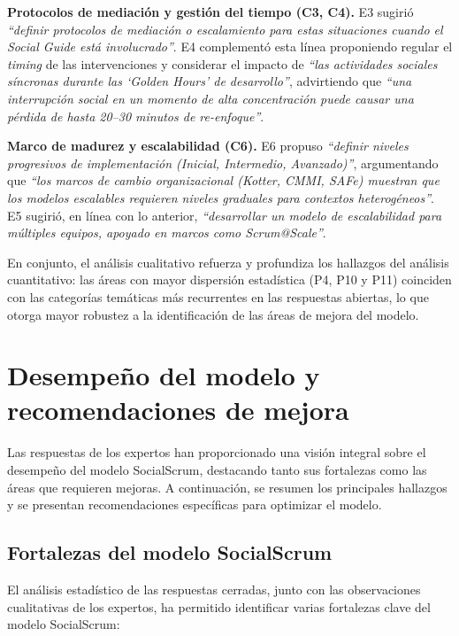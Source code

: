 \textbf{Protocolos de mediación y gestión del tiempo (C3, C4).} E3 sugirió \textit{``definir protocolos de mediación o escalamiento para estas situaciones cuando el Social Guide está involucrado''}. E4 complementó esta línea proponiendo regular el \textit{timing} de las intervenciones y considerar el impacto de \textit{``las actividades sociales síncronas durante las `Golden Hours' de desarrollo''}, advirtiendo que \textit{``una interrupción social en un momento de alta concentración puede causar una pérdida de hasta 20--30 minutos de re-enfoque''}.

\textbf{Marco de madurez y escalabilidad (C6).} E6 propuso \textit{``definir niveles progresivos de implementación (Inicial, Intermedio, Avanzado)''}, argumentando que \textit{``los marcos de cambio organizacional (Kotter, CMMI, SAFe) muestran que los modelos escalables requieren niveles graduales para contextos heterogéneos''}. E5 sugirió, en línea con lo anterior, \textit{``desarrollar un modelo de escalabilidad para múltiples equipos, apoyado en marcos como Scrum@Scale''}.

En conjunto, el análisis cualitativo refuerza y profundiza los hallazgos del análisis cuantitativo: las áreas con mayor dispersión estadística (P4, P10 y P11) coinciden con las categorías temáticas más recurrentes en las respuestas abiertas, lo que otorga mayor robustez a la identificación de las áreas de mejora del modelo.

\section{Desempeño del modelo y recomendaciones de mejora}
Las respuestas de los expertos han proporcionado una visión integral sobre el desempeño del modelo SocialScrum, destacando tanto sus fortalezas como las áreas que requieren mejoras. A continuación, se resumen los principales hallazgos y se presentan recomendaciones específicas para optimizar el modelo.

\subsection{Fortalezas del modelo SocialScrum}
El análisis estadístico de las respuestas cerradas, junto con las observaciones cualitativas de los expertos, ha permitido identificar varias fortalezas clave del modelo SocialScrum:

